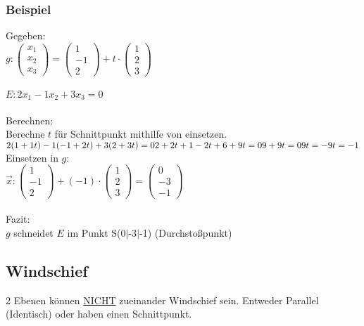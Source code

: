 \subsubsection{Beispiel}
Gegeben: \\
$
g:
\begin{pmatrix}
    x_1 \\ x_2 \\ x_3
\end{pmatrix}
=
\begin{pmatrix}
    1 \\ -1 \\ 2
\end{pmatrix}
+ t 
\cdot
\begin{pmatrix}
    1 \\ 2 \\ 3
\end{pmatrix}
$
\\\\
$
E: 2x_1 - 1x_2 + 3x_3 = 0
$
\\\\ 
Berechnen: \\
Berechne $t$ für Schnittpunkt mithilfe von einsetzen. \\
$
2(1 + 1t) - 1(-1 + 2t) + 3(2 + 3t) = 0 \\
2 + 2t + 1 - 2t + 6 + 9t = 0 \\
9 + 9t = 0 \\
9t = -9 \\
t = -1 \\
$
Einsetzen in $g$: \\
$
\vec{x}:
\begin{pmatrix}
    1 \\ -1 \\ 2 
\end{pmatrix}
+ 
(-1)
\cdot
\begin{pmatrix}
    1 \\ 2 \\ 3
\end{pmatrix}
= 
\begin{pmatrix}
    0 \\ -3 \\ -1
\end{pmatrix}
$ \\\\
Fazit: \\
$g$ schneidet $E$ im Punkt S(0$|$-3$|$-1) (Durchstoßpunkt)

\subsection{Windschief}
2 Ebenen können \underline{NICHT} zueinander Windschief sein.
Entweder Parallel (Identisch) oder haben einen Schnittpunkt.

